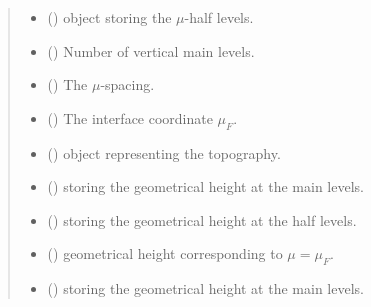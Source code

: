\documentclass[letterpaper,10pt,english]{sphinxmanual}
\begin{document}
\begin{fulllineitems}
\begin{quote}
\begin{description}
\begin{itemize}
\item {} 
 () \textendash{} {\hyperref[\detokenize{api:grids.axis.Axis}]{}} object storing the \(\mu\)-half levels.

\item {} 
 () \textendash{} Number of vertical main levels.

\item {} 
 () \textendash{} The \(\mu\)-spacing.

\item {} 
 () \textendash{} The interface coordinate \(\mu_F\).

\item {} 
{\hyperref[\detokenize{api:module-grids.topography}]{}} () \textendash{} {\hyperref[\detokenize{api:grids.topography.Topography1d}]{}} object representing
the topography.

\item {} 
 () \textendash{}  storing the geometrical height at
the main levels.

\item {} 
 () \textendash{}  storing the geometrical height at
the half levels.

\item {} 
 () \textendash{} geometrical height corresponding to \(\mu = \mu_F\).

\item {} 
 () \textendash{}  storing the geometrical height at
the main levels.


\end{itemize}
\end{description}
\end{quote}
\end{fulllineitems}
\end{document}
